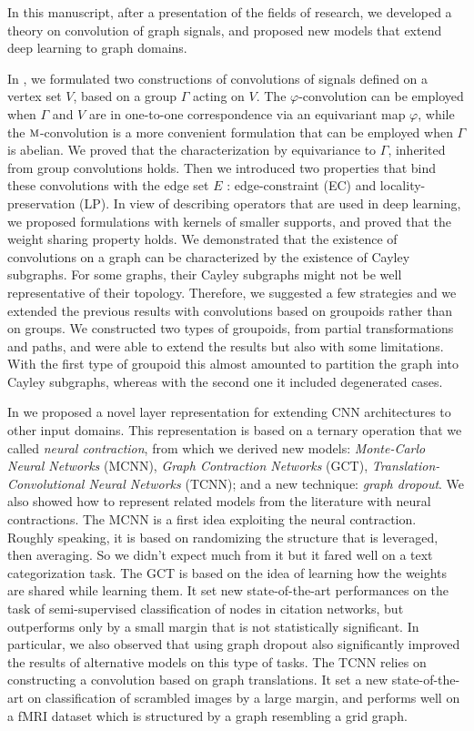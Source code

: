 In this manuscript, after a presentation of the fields of research, we developed a theory on convolution of graph signals, and proposed new models that extend deep learning to graph domains.

In , we formulated two constructions of convolutions of signals defined on a vertex set $V$, based on a group $\Gamma$ acting on $V$. The $\varphi$-convolution can be employed when $\Gamma$ and $V$ are in one-to-one correspondence via an equivariant map $\varphi$, while the $\operatorname{\textsc{m}}$-convolution is a more convenient formulation that can be employed when $\Gamma$ is abelian. We proved that the characterization by equivariance to $\Gamma$, inherited from group convolutions holds. Then we introduced two properties that bind these convolutions with the edge set $E$ : edge-constraint (EC) and locality-preservation (LP). In view of describing operators that are used in deep learning, we proposed formulations with kernels of smaller supports, and proved that the weight sharing property holds. We demonstrated that the existence of convolutions on a graph can be characterized by the existence of Cayley subgraphs. For some graphs, their Cayley subgraphs might not be well representative of their topology. Therefore, we suggested a few strategies and we extended the previous results with convolutions based on groupoids rather than on groups. We constructed two types of groupoids, from partial transformations and paths, and were able to extend the results but also with some limitations. With the first type of groupoid this almost amounted to partition the graph into Cayley subgraphs, whereas with the second one it included degenerated cases.

In  we proposed a novel layer representation for extending CNN architectures to other input domains. This representation is based on a ternary operation that we called \emph{neural contraction}, from which we derived new models: \emph{Monte-Carlo Neural Networks} (MCNN), \emph{Graph Contraction Networks} (GCT), \emph{Translation-Convolutional Neural Networks} (TCNN); and a new technique: \emph{graph dropout}. We also showed how to represent related models from the literature with neural contractions. The MCNN is a first idea exploiting the neural contraction. Roughly speaking, it is based on randomizing the structure that is leveraged, then averaging. So we didn't expect much from it but it fared well on a text categorization task. The GCT is based on the idea of learning how the weights are shared while learning them. It set new state-of-the-art performances on the task of semi-supervised classification of nodes in citation networks, but outperforms only by a small margin that is not statistically significant. In particular, we also observed that using graph dropout also significantly improved the results of alternative models on this type of tasks. The TCNN relies on constructing a convolution based on graph translations. It set a new state-of-the-art on classification of scrambled images by a large margin, and performs well on a fMRI dataset which is structured by a graph resembling a grid graph.

